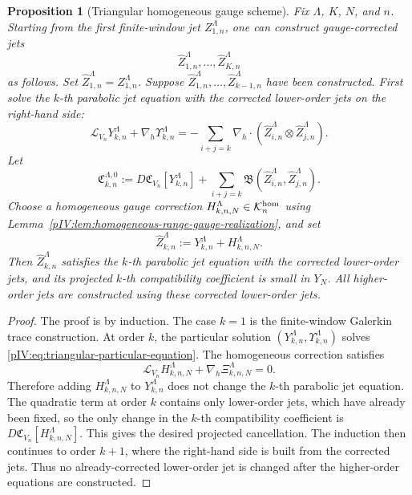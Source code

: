 \documentclass[11pt]{article}
\numberwithin{equation}{section}
\theoremstyle{plain}
\newtheorem{proposition}{Proposition}[section]
\theoremstyle{definition}
\theoremstyle{remark}
\newcommand{\nabh}{\nabla_h}
\newcommand{\calB}{\mathfrak B}
\newcommand{\calC}{\mathfrak C}
\newcommand{\calK}{\mathcal K}
\begin{document}
\begin{proposition}[Triangular homogeneous gauge scheme]
\label{pIV:prop:triangular-homogeneous-gauge}
Fix \(\Lambda\), \(K\), \(N\), and \(n\).  Starting from the first finite-window jet
\(Z^\Lambda_{1,n}\), one can construct gauge-corrected jets
\[
        \widehat Z^\Lambda_{1,n},\ldots,\widehat Z^\Lambda_{K,n}
\]
as follows.  Set \(\widehat Z^\Lambda_{1,n}=Z^\Lambda_{1,n}\).  Suppose
\(\widehat Z^\Lambda_{1,n},\ldots,\widehat Z^\Lambda_{k-1,n}\) have been constructed.
First solve the \(k\)-th parabolic jet equation with the corrected lower-order jets on
the right-hand side:
\begin{equation}\label{pIV:eq:triangular-particular-equation}
        \mathcal L_{V_n}Y^\Lambda_{k,n}+\nabh\Upsilon^\Lambda_{k,n}
        =-
        \sum_{i+j=k}\nabh\cdot
        (\widehat Z^\Lambda_{i,n}\otimes \widehat Z^\Lambda_{j,n}).
\end{equation}
Let
\begin{equation}\label{pIV:eq:triangular-particular-coeff}
        \calC^{\Lambda,0}_{k,n}
        :=D\calC_{V_n}[Y^\Lambda_{k,n}]
        +
        \sum_{i+j=k}\calB(\widehat Z^\Lambda_{i,n},\widehat Z^\Lambda_{j,n}).
\end{equation}
Choose a homogeneous gauge correction
\(H^\Lambda_{k,n,N}\in\calK^{\rm hom}_n\) using
Lemma~\ref{pIV:lem:homogeneous-range-gauge-realization}, and set
\begin{equation}\label{pIV:eq:triangular-corrected-jet}
        \widehat Z^\Lambda_{k,n}:=Y^\Lambda_{k,n}+H^\Lambda_{k,n,N}.
\end{equation}
Then \(\widehat Z^\Lambda_{k,n}\) satisfies the \(k\)-th parabolic jet equation with the
corrected lower-order jets, and its projected \(k\)-th compatibility coefficient is
small in \(Y_N\).  All higher-order jets are constructed using these corrected
lower-order jets.
\end{proposition}

\begin{proof}
The proof is by induction.  The case \(k=1\) is the finite-window Galerkin trace
construction.  At order \(k\), the particular solution
\((Y^\Lambda_{k,n},\Upsilon^\Lambda_{k,n})\) solves
\eqref{pIV:eq:triangular-particular-equation}.  The homogeneous correction satisfies
\[
        \mathcal L_{V_n}H^\Lambda_{k,n,N}+\nabh\Xi^\Lambda_{k,n,N}=0.
\]
Therefore adding \(H^\Lambda_{k,n,N}\) to \(Y^\Lambda_{k,n}\) does not change the
\(k\)-th parabolic jet equation.  The quadratic term at order \(k\) contains only
lower-order jets, which have already been fixed, so the only change in the \(k\)-th
compatibility coefficient is
\(D\calC_{V_n}[H^\Lambda_{k,n,N}]\).  This gives the desired projected cancellation.
The induction then continues to order \(k+1\), where the right-hand side is built
from the corrected jets.  Thus no already-corrected lower-order jet is changed after
the higher-order equations are constructed.
\end{proof}
\end{document}
